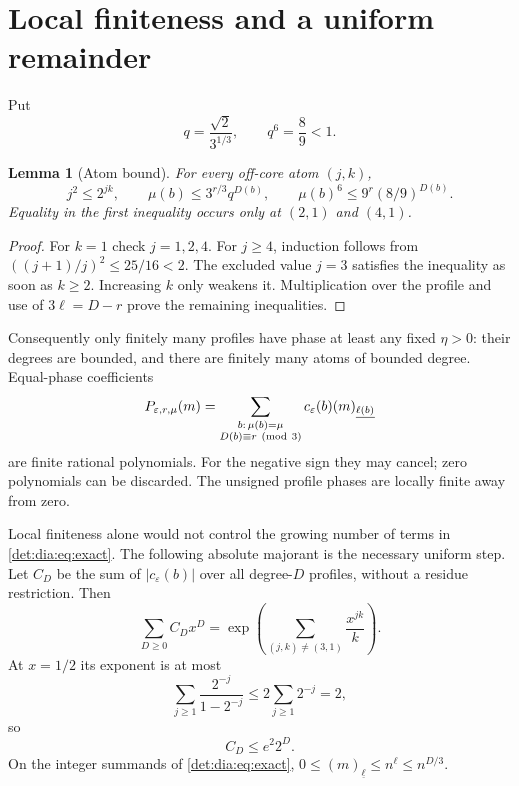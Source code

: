 \documentclass[11pt,letterpaper]{article}
\numberwithin{equation}{section}
\newtheorem{lemma}[theorem]{Lemma}
\theoremstyle{definition}\newtheorem{definition}[theorem]{Definition}
\theoremstyle{remark}\newtheorem{remark}[theorem]{Remark}
\newcommand{\fall}[2]{(#1)_{\underline{#2}}}
\newcommand{\eps}{\varepsilon}
\begin{document}
\section{Local finiteness and a uniform remainder}
Put
\begin{equation}\label{det:dia:eq:q}
 q=\frac{\sqrt2}{3^{1/3}},\qquad q^6=\frac89<1.
\end{equation}
\begin{lemma}[Atom bound]\label{det:dia:lem:atom}
For every off-core atom $(j,k)$,
\begin{equation}\label{det:dia:eq:atomineq}
 j^2\leq 2^{jk},\qquad
 \mu(b)\leq3^{r/3}q^{D(b)},\qquad
 \mu(b)^6\leq9^r(8/9)^{D(b)}.
\end{equation}
Equality in the first inequality occurs only at $(2,1)$ and $(4,1)$.
\end{lemma}
\begin{proof}
For $k=1$ check $j=1,2,4$. For $j\geq4$, induction follows from
$((j+1)/j)^2\leq25/16<2$. The excluded value $j=3$ satisfies the
inequality as soon as $k\geq2$. Increasing $k$ only weakens it.
Multiplication over the profile and use of $3\ell=D-r$ prove the
remaining inequalities.
\end{proof}
Consequently only finitely many profiles have phase at least any fixed
$\eta>0$: their degrees are bounded, and there are finitely many atoms
of bounded degree. Equal-phase coefficients
\begin{equation}\label{det:dia:eq:polynomial}
 P_{\eps,r,\mu}(m)=
 \sum_{\substack{b:\,\mu(b)=\mu\\D(b)\equiv r\ ({\rm mod}\ 3)}}
 c_\eps(b)\fall{m}{\ell(b)}
\end{equation}
are finite rational polynomials. For the negative sign they may cancel;
zero polynomials can be discarded. The unsigned profile phases are
locally finite away from zero.

Local finiteness alone would not control the growing number of terms in
\eqref{det:dia:eq:exact}. The following absolute majorant is the necessary
uniform step. Let $C_D$ be the sum of $|c_\eps(b)|$ over all degree-$D$
profiles, without a residue restriction. Then
\[
 \sum_{D\geq0}C_D x^D=
 \exp\left(\sum_{(j,k)\ne(3,1)}\frac{x^{jk}}{k}\right).
\]
At $x=1/2$ its exponent is at most
\[
 \sum_{j\geq1}\frac{2^{-j}}{1-2^{-j}}
 \leq 2\sum_{j\geq1}2^{-j}=2,
\]
so
\begin{equation}\label{det:dia:eq:mass}
 C_D\leq e^2 2^D.
\end{equation}
On the integer summands of \eqref{det:dia:eq:exact},
$0\leq\fall{m}{\ell}\leq n^\ell\leq n^{D/3}$.
\end{document}
